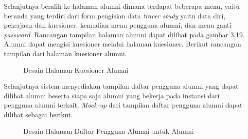 Selanjutnya beralih ke halaman alumni dimana terdapat beberapa menu, yaitu beranda yang terdiri dari form pengisian data \textit{tracer study} yaitu data diri, pekerjaan dan kuesioner, kemudian menu pengguna alumni, dan menu ganti \textit{password}. Rancangan tampilan halaman alumni dapat dilihat pada gambar 3.19. Alumni dapat mengisi kuesioner melalui halaman kuesioner. Berikut rancangan tampilan dari halaman kuesioner alumni.

\begin{figure}[H]
	\centering
	\caption{Desain Halaman Kuesioner Alumni}
	\label{alumni_beranda}
\end{figure}

Selanjutnya sistem menyediakan tampilan daftar pengguna alumni yang dapat dilihat alumni beserta siapa saja alumni yang bekerja pada instansi dari pengguna alumni terkait.\textit{ Mock-up} dari tampilan daftar pengguna alumni dapat dilihat sebagai berikut.

\begin{figure}[H]
	\centering
	\caption{Desain Halaman Daftar Pengguna Alumni untuk Alumni}
	\label{alumni_beranda}
\end{figure}

